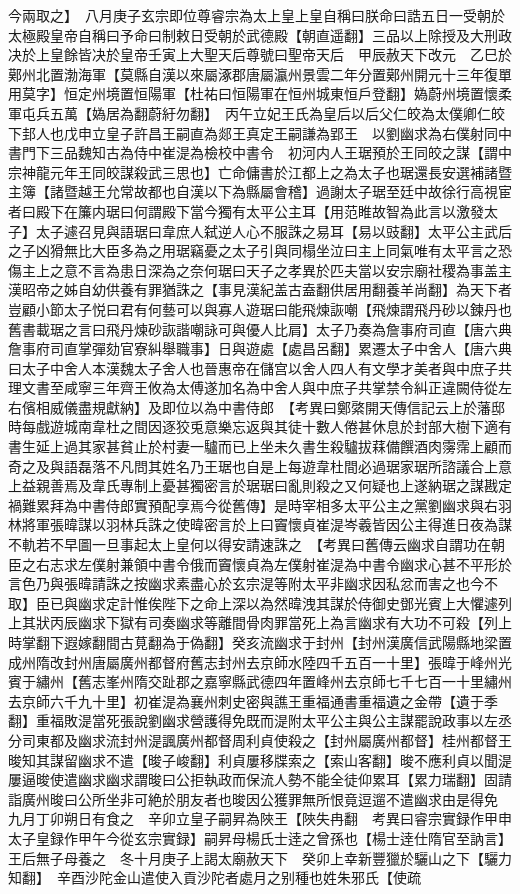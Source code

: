 今兩取之】　八月庚子玄宗即位尊睿宗為太上皇上皇自稱曰朕命曰誥五日一受朝於太極殿皇帝自稱曰予命曰制敕日受朝於武德殿【朝直遥翻】三品以上除授及大刑政决於上皇餘皆决於皇帝壬寅上大聖天后尊號曰聖帝天后　甲辰赦天下改元　乙巳於鄚州北置渤海軍【莫縣自漢以來屬涿郡唐屬瀛州景雲二年分置鄚州開元十三年復單用莫字】恒定州境置恒陽軍【杜祐曰恒陽軍在恒州城東恒戶登翻】媯蔚州境置懷柔軍屯兵五萬【媯居為翻蔚紆勿翻】　丙午立妃王氏為皇后以后父仁皎為太僕卿仁皎下邽人也戊申立皇子許昌王嗣直為郯王真定王嗣謙為郢王　以劉幽求為右僕射同中書門下三品魏知古為侍中崔湜為檢校中書令　初河内人王琚預於王同皎之謀【謂中宗神龍元年王同皎謀殺武三思也】亡命傭書於江都上之為太子也琚還長安選補諸暨主簿【諸暨越王允常故都也自漢以下為縣屬會稽】過謝太子琚至廷中故徐行高視宦者曰殿下在簾内琚曰何謂殿下當今獨有太平公主耳【用范睢故智為此言以激發太子】太子遽召見與語琚曰韋庶人弑逆人心不服誅之易耳【易以豉翻】太平公主武后之子凶猾無比大臣多為之用琚竊憂之太子引與同榻坐泣曰主上同氣唯有太平言之恐傷主上之意不言為患日深為之奈何琚曰天子之孝異於匹夫當以安宗廟社稷為事盖主漢昭帝之姊自幼供養有罪猶誅之【事見漢紀盖古盍翻供居用翻養羊尚翻】為天下者豈顧小節太子悦曰君有何藝可以與寡人遊琚曰能飛煉詼嘲【飛煉謂飛丹砂以鍊丹也舊書載琚之言曰飛丹煉砂詼諧嘲詠可與優人比肩】太子乃奏為詹事府司直【唐六典詹事府司直掌彈劾官寮糾舉職事】日與遊處【處昌呂翻】累遷太子中舍人【唐六典曰太子中舍人本漢魏太子舍人也晉惠帝在儲宫以舍人四人有文學才美者與中庶子共理文書至咸寧三年齊王攸為太傅遂加名為中舍人與中庶子共掌禁令糾正違闕侍從左右儐相威儀盡規獻納】及即位以為中書侍郎　【考異曰鄭綮開天傳信記云上於藩邸時每戲遊城南韋杜之間因逐狡兎意樂忘返與其徒十數人倦甚休息於封部大樹下適有書生延上過其家甚貧止於村妻一驢而已上坐未久書生殺驢拔䔉備饌酒肉霶霈上顧而奇之及與語磊落不凡問其姓名乃王琚也自是上每遊韋杜間必過琚家琚所諮議合上意上益親善焉及韋氏專制上憂甚獨密言於琚琚曰亂則殺之又何疑也上遂納琚之謀戡定禍難累拜為中書侍郎實預配享焉今從舊傳】是時宰相多太平公主之黨劉幽求與右羽林將軍張暐謀以羽林兵誅之使暐密言於上曰竇懷貞崔湜岑羲皆因公主得進日夜為謀不軌若不早圖一旦事起太上皇何以得安請速誅之　【考異曰舊傳云幽求自謂功在朝臣之右志求左僕射兼領中書令俄而竇懷貞為左僕射崔湜為中書令幽求心甚不平形於言色乃與張暐請誅之按幽求素盡心於玄宗湜等附太平非幽求因私忿而害之也今不取】臣已與幽求定計惟俟陛下之命上深以為然暐洩其謀於侍御史鄧光賓上大懼遽列上其狀丙辰幽求下獄有司奏幽求等離間骨肉罪當死上為言幽求有大功不可殺【列上時掌翻下遐嫁翻間古莧翻為于偽翻】癸亥流幽求于封州【封州漢廣信武陽縣地梁置成州隋改封州唐屬廣州都督府舊志封州去京師水陸四千五百一十里】張暐于峰州光賓于繡州【舊志峯州隋交趾郡之嘉寧縣武德四年置峰州去京師七千七百一十里繡州去京師六千九十里】初崔湜為襄州刺史密與譙王重福通書重福遺之金帶【遺于季翻】重福敗湜當死張說劉幽求營護得免既而湜附太平公主與公主謀罷說政事以左丞分司東都及幽求流封州湜諷廣州都督周利貞使殺之【封州屬廣州都督】桂州都督王晙知其謀留幽求不遣【晙子峻翻】利貞屢移牒索之【索山客翻】晙不應利貞以聞湜屢逼晙使遣幽求幽求謂晙曰公拒執政而保流人勢不能全徒仰累耳【累力瑞翻】固請詣廣州晙曰公所坐非可絶於朋友者也晙因公獲罪無所恨竟逗遛不遣幽求由是得免　九月丁卯朔日有食之　辛卯立皇子嗣昇為陜王【陜失冉翻　考異曰睿宗實録作甲申太子皇録作甲午今從玄宗實録】嗣昇母楊氏士逹之曾孫也【楊士逹仕隋官至訥言】王后無子母養之　冬十月庚子上謁太廟赦天下　癸卯上幸新豐獵於驪山之下【驪力知翻】　辛酉沙陀金山遣使入貢沙陀者處月之别種也姓朱邪氏【使疏